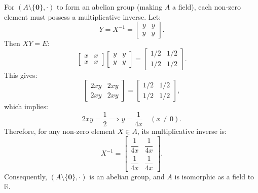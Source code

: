 For $(A \setminus \{\mathbf{0}\}, \cdot)$ to form an abelian group (making $A$ a field), each non-zero element must possess a multiplicative inverse. Let:
\[
Y = X^{-1} = \begin{bmatrix} y & y \\ y & y \end{bmatrix}.
\]
Then $X Y = E$:
\[
\begin{bmatrix} x & x \\ x & x \end{bmatrix} \begin{bmatrix} y & y \\ y & y \end{bmatrix} = \begin{bmatrix} 1/2 & 1/2 \\ 1/2 & 1/2 \end{bmatrix}.
\]
This gives:
\[
\begin{bmatrix} 2xy & 2xy \\ 2xy & 2xy \end{bmatrix} = \begin{bmatrix} 1/2 & 1/2 \\ 1/2 & 1/2 \end{bmatrix},
\]
which implies:
\[
2xy = \frac{1}{2} \implies y = \frac{1}{4x} \quad (x \neq 0).
\]
Therefore, for any non-zero element $X \in A$, its multiplicative inverse is:
\[
X^{-1} = \begin{bmatrix} \dfrac{1}{4x} & \dfrac{1}{4x} \\[6pt] \dfrac{1}{4x} & \dfrac{1}{4x} \end{bmatrix}.
\]
Consequently, $(A \setminus \{\mathbf{0}\}, \cdot)$ is an abelian group, and $A$ is isomorphic as a field to $\mathbb{R}$.
